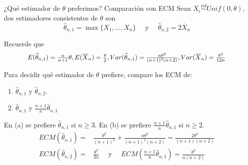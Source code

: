 \documentclass{beamer}
\theoremstyle{definition}
\begin{document}
\begin{frame}{\color{rosee} ¿Qué estimador de $\theta$ preferimos? Comparación con ECM}
  \small
    Sean $X_i\stackrel{iid}{\sim} Unif(0,\theta)$, dos estimadores consistentes de $\theta$ son
    \[\widehat{\theta}_{n,1}=\max\{X_{1},\dots, X_{n}\} \quad \text{ y } \quad \widehat{\theta}_{n,2}=2\overline{X}_n\]
    
    Recuerde que 
    \[ \scalebox{0.95}{$E(\widehat{\theta}_{n,1})=\frac{n}{n+1}\theta, E(\overline{X}_n)=\frac{\theta}{2}, Var(\widehat{\theta}_{n,1})=\frac{n\theta^2}{(n+1)^2(n+2)}, Var(\overline{X}_n)=\frac{\theta^2}{12n}$}\]
    
    Para decidir qué estimador de $\theta$ prefiere, compare los ECM de:
    \begin{enumerate}[label=(\alph*)]
        \item  $\widehat{\theta}_{n,1}$ y $\widehat{\theta}_{n,2}$.
        \item $\widehat{\theta}_{n,1}$ y $\frac{n+1}{n}\widehat{\theta}_{n,1}$
    \end{enumerate}

\color{gray}
En (a) se prefiere $\widehat{\theta}_{n,1}$ si $n \geq 3$.  En (b) se prefiere $\frac{n+1}{n}\widehat{\theta}_{n,1}$ si $n \geq 2$.
\begin{align*}
    ECM(\widehat{\theta}_{n,1})=&\frac{\theta^2}{(n+1)^2}+\frac{n\theta^2}{(n+1)^2(n+2)}=\frac{2\theta^2}{(n+1)(n+2)}\\ ECM(\widehat{\theta}_{n,2})=&\frac{\theta^2}{3n} \quad  \text{ y } \quad ECM\left( \frac{n+1}{n}\widehat{\theta}_{n,1}\right)=\frac{\theta^2}{n(n+2)}
\end{align*}


  
\end{frame}

\end{document}

